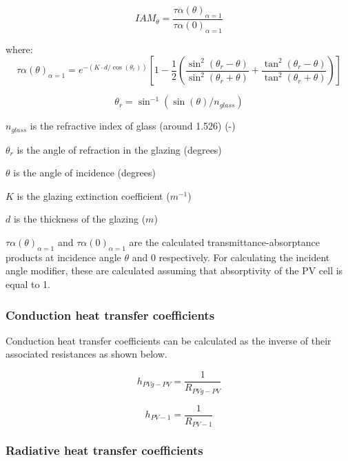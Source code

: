 \begin{equation}
IAM_{\theta}=\frac{\tau\alpha(\theta)_{\alpha=1}}{\tau\alpha(0)_{\alpha=1}}
\label{eq:BIPVT-IAM}
\end{equation}

where:
\begin{equation}
\tau\alpha(\theta)_{\alpha=1}=e^{-\left(K\cdot d/\cos\left(\theta_{r}\right)\right)}\left[1-\frac{1}{2}\left(\frac{\sin^{2}(\theta_{r}-\theta)}{\sin^{2}(\theta_{r}+\theta)}+\frac{\tan^{2}(\theta_{r}-\theta)}{\tan^{2}(\theta_{r}+\theta)}\right)\right]
\label{eq:BIPVT-IAM-2}
\end{equation}

\begin{equation}
\theta_{r}=\sin^{-1}\left(\sin(\theta)/n_{glass}\right)
\label{eq:BIPVT-theta-r}
\end{equation}

\(n_{glass}\) is the refractive index of glass (around 1.526) (-)

\(\theta_{r}\) is the angle of refraction in the glazing (degrees)

\(\theta\) is the angle of incidence (degrees)

\(K\) is the glazing extinction coefficient (\(m^{-1}\))

\(d\) is the thickness of the glazing (\(m\))

\(\tau\alpha(\theta)_{\alpha=1}\) and \(\tau\alpha(0)_{\alpha=1}\) are the calculated transmittance-absorptance products at incidence angle \(\theta\) and 0 respectively. For calculating the incident angle modifier, these are calculated assuming that absorptivity of the PV cell is equal to 1.

\subsubsection{Conduction heat transfer coefficients}\label{BIPVT-htc-c}

Conduction heat transfer coefficients can be calculated as the inverse of their associated resistances as shown below.

\begin{equation}
h_{PVg-PV}=\frac{1}{R_{PVg-PV}}
\label{eq:BIPVT-h-glass-cell}
\end{equation}

\begin{equation}
h_{PV-1}=\frac{1}{R_{PV-1}}
\label{eq:BIPVT-h-cell-1}
\end{equation}

\subsubsection{Radiative heat transfer coefficients}\label{BIPVT-htc-r}

